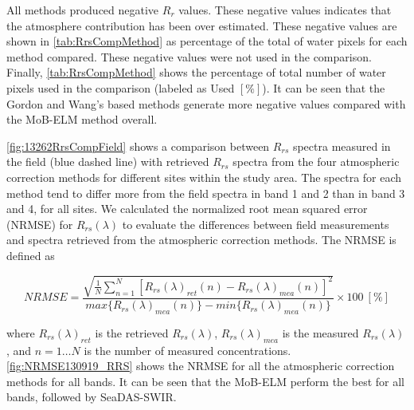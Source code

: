 All methods produced negative $R_{r}$ values. These negative values indicates that the atmosphere contribution has been over estimated. These negative values are shown in \autoref{tab:RrsCompMethod} as percentage of the total of water pixels for each method compared. These negative values were not used in the comparison. Finally, \autoref{tab:RrsCompMethod} shows the percentage of total number of water pixels used in the comparison (labeled as Used $[\%]$). It can be seen that the Gordon and Wang's based methods generate more negative values compared with the MoB-ELM method overall. 

\autoref{fig:13262RrsCompField} shows a comparison between $R_{rs}$ spectra measured in the field (blue dashed line) with retrieved $R_{rs}$ spectra from the four atmospheric correction methods for different sites within the study area. The spectra for each method tend to differ more from the field spectra in band 1 and 2 than in band 3 and 4, for all sites. We calculated the normalized root mean squared error (NRMSE) for $R_{rs}(\lambda)$ to evaluate the differences between field measurements and spectra retrieved from the atmospheric correction methods. The NRMSE is defined as

\begin{equation}
\label{eq:NRMSE}
  NRMSE =\frac{\sqrt{\frac{1}{N}\sum_{n=1}^N{\left[R_{rs}(\lambda)_{ret}(n) - R_{rs}(\lambda)_{mea}(n)\right]^2}}}{max\{R_{rs}(\lambda)_{mea}(n)\} - min\{R_{rs}(\lambda)_{mea}(n)\}}\times100 ~[\%]
\end{equation}

\noindent where $R_{rs}(\lambda)_{ret}$ is the retrieved $R_{rs}(\lambda)$, $R_{rs}(\lambda)_{mea}$ is the measured $R_{rs}(\lambda)$, and $n=1\dots N$ is the number of measured concentrations. \autoref{fig:NRMSE130919_RRS} shows the NRMSE for all the atmospheric correction methods for all bands. It can be seen that the MoB-ELM perform the best for all bands, followed by SeaDAS-SWIR. 




